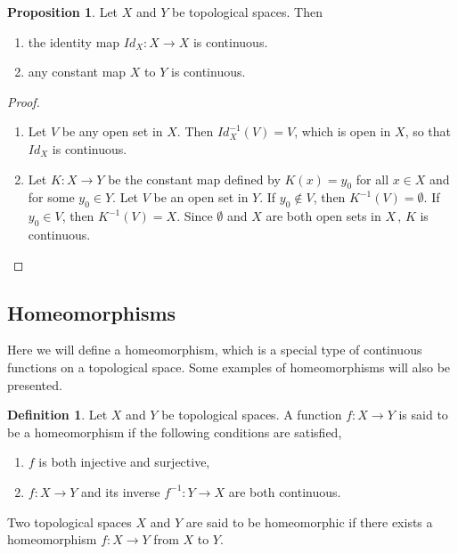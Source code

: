 \documentclass[11pt,a4paper]{article}
\theoremstyle{definition}
\newtheorem{defn}[thm]{Definition}
\newtheorem{prop}[thm]{Proposition}
\begin{document}
\begin{prop}
Let $X$ and $Y$ be topological spaces. Then
\begin{enumerate}
\item[i] the identity map $Id_X:X\rightarrow X$ is continuous.
\item[ii] any constant map $X$ to $Y$ is continuous.
\end{enumerate}
\end{prop}

\begin{proof}
\begin{enumerate}
\item[i] Let $V$ be any open set in $X$. Then $Id_X^{-1}(V)=V$, which is open in $X$, so that $Id_X$ is continuous.
\item[ii] Let $K:X\rightarrow Y$ be the constant map defined by $K(x)=y_0$ for all $x\in X$ and for some $y_0\in Y$. Let $V$ be an open set in $Y$. If $y_0\not\in V$, then $K^{-1}(V)=\emptyset$. If $y_0\in V$, then $K^{-1}(V)=X$. Since $\emptyset$ and $X$ are both open sets in $X\,,\, K$ is continuous.
\end{enumerate}
\end{proof}











\subsection{Homeomorphisms}
Here we will define a homeomorphism, which is a special type of continuous functions on a topological space. Some examples of homeomorphisms will also be presented.



\begin{defn}
Let $X$ and $Y$ be topological spaces. A function $f:X\rightarrow Y$ is said to be a homeomorphism if the following conditions are satisfied,
\begin{enumerate}
\item[i] $f$ is both injective and surjective,
\item[ii] $f:X\rightarrow Y$ and its inverse $f^{-1}:Y\rightarrow X$ are both continuous.
\end{enumerate}


Two topological spaces $X$ and $Y$ are said to be homeomorphic if there exists a homeomorphism $f:X\rightarrow Y$ from $X$ to $Y$.
\end{defn}
\end{document}
